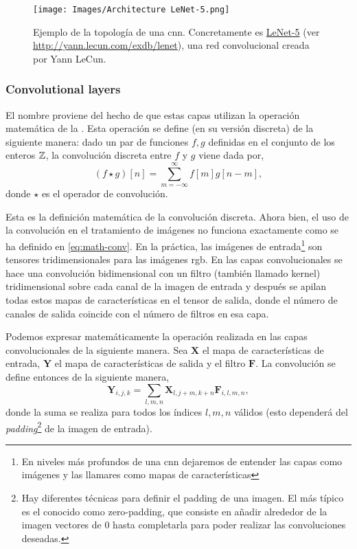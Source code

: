 \begin{figure}[ht]
  \centering
  \texttt{[image: Images/Architecture LeNet-5.png]}
  \caption[Ejemplo de topología de una \acrshort{cnn} (LeNet-5)]{Ejemplo de la
    topología de una \gls{cnn}. Concretamente es
    \href{http://yann.lecun.com/exdb/lenet}{LeNet-5} (ver
    \url{http://yann.lecun.com/exdb/lenet}), una red convolucional creada por
    Yann LeCun.}
  \label{fig:lenet-5}
\end{figure}

\subsubsection{Convolutional layers}
El nombre proviene del hecho de que estas capas utilizan la operación
matemática de la
. Esta operación
se define (en su versión discreta) de la siguiente manera: dado un par de
funciones \(f, g\) definidas en el conjunto de los enteros \(\mathbb{Z}\), la
convolución discreta entre \(f\) y \(g\) viene dada por,
\begin{equation} \label{eq:math-conv}
  (f \star g)[n] = \sum_{m=-\infty}^{\infty} f[m]g[n - m],
\end{equation}
donde \(\star\) es el operador de convolución.

Esta es la definición matemática de la convolución discreta. Ahora bien, el uso
de la convolución en el tratamiento de imágenes no funciona exactamente como se
ha definido en \vref{eq:math-conv}. En la práctica, las imágenes de
entrada\footnote{En niveles más profundos de una \gls{cnn} dejaremos de
  entender las capas como imágenes y las llamares como mapas de
  características} son tensores tridimensionales para las imágenes
\acrshort{rgb}. En las capas convolucionales se hace una convolución
bidimensional con un filtro (también llamado kernel) tridimensional sobre cada
canal de la imagen de entrada y después se apilan todas estos mapas de
características en el tensor de salida, donde el número de canales de salida
coincide con el número de filtros en esa capa.

Podemos expresar matemáticamente la operación realizada en las capas
convolucionales de la siguiente manera. Sea \(\mathbf{X}\) el
mapa de características de entrada, \(\mathbf{Y}\) el mapa de características
de salida y el filtro \(\mathbf{F}\). La convolución se define entonces de la
siguiente manera,
\begin{equation} \label{eq:convolution}
  \mathbf{Y}_{i, j, k} =
  \sum_{l, m, n} \mathbf{X}_{l, j + m, k + n}\mathbf{F}_{i, l, m, n},
\end{equation}
donde la suma se realiza para todos los índices \(l, m, n\) válidos (esto
dependerá del \emph{padding}\footnote{Hay diferentes técnicas para definir el
  padding de una imagen. El más típico es el conocido como zero-padding, que
  consiste en añadir alrededor de la imagen vectores de 0 hasta completarla
  para poder realizar las convoluciones deseadas.} de la imagen de entrada).

